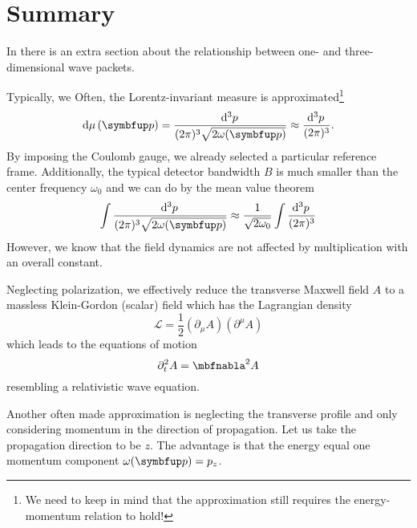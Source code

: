 \section*{Summary}

In \cite[p.~53]{Cohen2019} there is an extra section about the relationship between one- and three-dimensional wave packets.

Typically, we 
Often, the Lorentz-invariant measure is approximated\footnote{We need to keep in mind that the approximation still requires the energy-momentum relation to hold!}
\begin{equation}
	\dd{\mu}(\vb{p})
	=
	\frac{\dd[3]{p}}{(2\pi)^3\sqrt{2\omega(\vb{p})}}
	\approx
	\frac{\dd[3]{p}}{(2\pi)^3}
	.
\end{equation}
By imposing the Coulomb gauge, we already selected a particular reference frame.
Additionally, the typical detector bandwidth $B$ is much smaller than the center frequency $\omega_0$ and we can do by the mean value theorem
\begin{equation}
	\int
	\frac{\dd[3]{p}}{(2\pi)^3\sqrt{2\omega(\vb{p})}}
	\approx
	\frac{1}{\sqrt{2\omega_0}}
	\int
	\frac{\dd[3]{p}}{(2\pi)^3}
\end{equation}
However, we know that the field dynamics are not affected by multiplication with an overall constant.

Neglecting polarization, we effectively reduce the transverse Maxwell field $A$ to a massless Klein-Gordon (scalar) field which has the Lagrangian density
\begin{equation}
	\mathcal{L}
	=
	\frac{1}{2}
	\left(
		\partial_\mu A
	\right)
	\left(
		\partial^\mu A
	\right)
\end{equation}
which leads to the equations of motion
\begin{equation}
	\partial_t^2 A
	=
	\laplace A
\end{equation}
resembling a relativistic wave equation.

Another often made approximation is neglecting the transverse profile and only considering momentum in the direction of propagation.
Let us take the propagation direction to be $z$.
The advantage is that the energy equal one momentum component $\omega(\vb{p})=p_z$.




